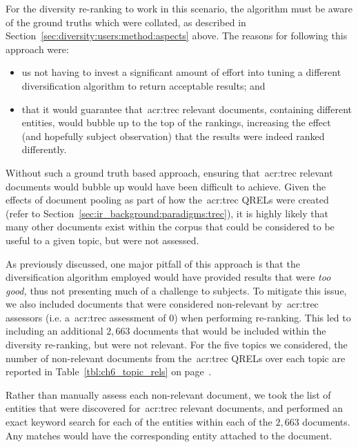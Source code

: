 For the diversity re-ranking to work in this scenario, the algorithm must be aware of the ground truths which were collated, as described in Section~\ref{sec:diversity:users:method:aspects} above. The reasons for following this approach were:

\begin{itemize}
    \item{us not having to invest a significant amount of effort into tuning a different diversification algorithm to return acceptable results; and}
    \item{that it would guarantee that~\gls{acr:trec} relevant documents, containing different entities, would bubble up to the top of the rankings, increasing the effect (and hopefully subject observation) that the results were indeed ranked differently.}
\end{itemize}

Without such a ground truth based approach, ensuring that~\gls{acr:trec} relevant documents would bubble up would have been difficult to achieve. Given the effects of document pooling as part of how the~\gls{acr:trec} QRELs were created (refer to Section~\ref{sec:ir_background:paradigms:trec}), it is highly likely that many other documents exist within the corpus that could be considered to be useful to a given topic, but were not assessed.

As previously discussed, one major pitfall of this approach is that the diversification algorithm employed would have provided results that were \emph{too good,} thus not presenting much of a challenge to subjects. To mitigate this issue, we also included documents that were considered non-relevant by~\gls{acr:trec} assessors (i.e. a~\gls{acr:trec} assessment of $0$) when performing re-ranking. This led to including an additional $2,663$ documents that would be included within the diversity re-ranking, but were not relevant. For the five topics we considered, the number of non-relevant documents from the~\gls{acr:trec} QRELs over each topic are reported in Table~\ref{tbl:ch6_topic_rels} on page~\pageref{tbl:ch6_topic_rels}.

Rather than manually assess each non-relevant document, we took the list of entities that were discovered for~\gls{acr:trec} relevant documents, and performed an exact keyword search for each of the entities within each of the $2,663$ documents. Any matches would have the corresponding entity attached to the document.

